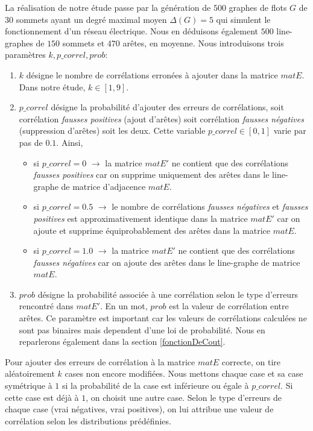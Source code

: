 La r\'ealisation de notre \'etude passe par la g\'en\'eration de $500$ graphes de flots $G$ de $30$ sommets ayant un degr\'e maximal moyen $\Delta(G) = 5$ qui simulent le fonctionnement d'un r\'eseau \'electrique. Nous en d\'eduisons \'egalement $500$ line-graphes de $150$ sommets et $470$ ar\^etes, en moyenne. \newline
Nous introduisons trois param\`etres $k, p\_correl, prob$:
\begin{enumerate}
\item $k$ d\'esigne le nombre de corr\'elations erron\'ees \`a ajouter dans la matrice $matE$. Dans notre \'etude, $k \in [1,9]$.
\item $p\_correl$ d\'esigne la probabilit\'e d'ajouter des erreurs de corr\'elations, soit corr\'elation {\em fausses positives} (ajout d'ar\^etes) soit corr\'elation {\em fausses n\'egatives} (suppression d'ar\^etes) soit les deux. Cette variable $p\_correl \in [0,1]$ varie par pas de $0.1$. Ainsi,
	\begin{itemize}
	\item si $p\_correl=0$ $\rightarrow$ la matrice $matE'$ ne contient que des  corr\'elations {\em fausses positives} car on supprime uniquement des ar\^etes dans le line-graphe de matrice d'adjacence $matE$.
	\item si $p\_correl=0.5$ $\rightarrow$ le nombre de corr\'elations {\em fausses n\'egatives} et  {\em fausses positives} est approximativement identique  dans la matrice $matE'$ car on ajoute et supprime \'equiprobablement des ar\^etes dans la matrice $matE$.
	\item si $p\_correl=1.0$ $\rightarrow$ la matrice $matE'$ ne contient que des corr\'elations {\em fausses n\'egatives} car on ajoute des ar\^etes dans le line-graphe de matrice $matE$.
	\end{itemize}
\item $prob$ d\'esigne la probabilit\'e associ\'ee \`a une corr\'elation selon le type d'erreurs rencontr\'e dans $matE'$. En un mot, $prob$ est la valeur de corr\'elation entre ar\^etes.
Ce param\`etre est important car les valeurs de corr\'elations calcul\'ees  ne sont pas binaires mais dependent d'une loi de probabilit\'e. Nous en reparlerons \'egalement dans la section \ref{fonctionDeCout}.
\end{enumerate}
Pour ajouter des erreurs de corr\'elation \`a la matrice $matE$ correcte, on tire al\'eatoirement $k$ cases non encore modifi\'ees. Nous mettons chaque case et sa case sym\'etrique \`a $1$ si la probabilit\'e de la case est inf\'erieure ou \'egale \`a $p\_correl$. Si cette case est d\'ej\`a \`a $1$, on choisit une autre case. Selon le type d'erreurs de chaque case (vrai n\'egatives, vrai positives), on lui attribue une valeur de corr\'elation selon les distributions pr\'ed\'efinies.
\newline

